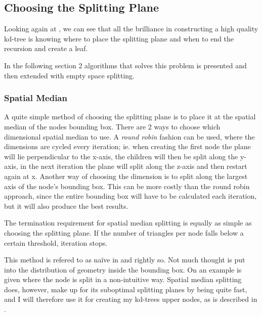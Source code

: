\subsection{Choosing the Splitting Plane}\label{sec:splittingPlane}


Looking again at , we can see that all the
brilliance in constructing a high quality kd-tree is knowing where to
place the splitting plane and when to end the recursion and create a
leaf.


In the following section 2 algorithms that solves this problem is
presented and then extended with empty space splitting.


\subsubsection{Spatial Median}



A quite simple method of choosing the splitting plane is to place it
at the spatial median of the nodes bounding box. There are 2 ways to
choose which dimensional spatial median to use. A \textit{round robin}
fashion can be used, where the dimensions are cycled every iteration;
ie. when creating the first node the plane will lie perpendicular to
the x-axis, the children will then be split along the y-axis, in the
next iteration the plane will split along the z-axis and then restart
again at x. Another way of choosing the dimension is to split along
the largest axis of the node's bounding box. This can be more costly
than the round robin approach, since the entire bounding box will have
to be calculated each iteration, but it will also produce the best
results.

The termination requirement for spatial median splitting is equally as
simple as choosing the splitting plane. If the number of triangles per
node falls below a certain threshold, iteration stops.


This method is refered to as naïve in  and
rightly so. Not much thought is put into the distribution of geometry
inside the bounding box. On  an example is
given where the node is split in a non-intuitive way. Spatial median
splitting does, however, make up for its suboptimal splitting planes
by being quite fast, and I will therefore use it for creating my
kd-trees upper nodes, as is described in .

